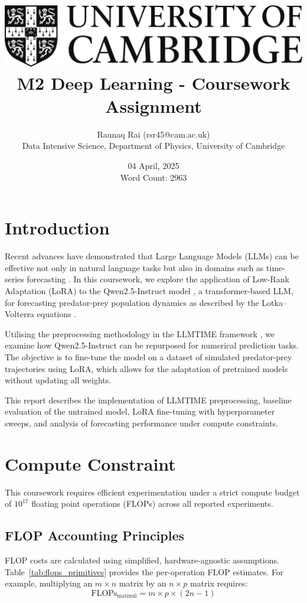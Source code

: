 \documentclass[a4paper,12pt]{article}
\title{
    \includegraphics[scale=0.4]{Cam_logo_bw.png}\\
    \vspace{0.5cm}
    M2 Deep Learning - Coursework Assignment
}
\author{Raunaq Rai (rsr45@cam.ac.uk)\\
    Data Intensive Science, Department of Physics, University of Cambridge
}
\date{04 April, 2025 \\ \vspace{0.2cm} {\small Word Count: 2963}}
\begin{document}
\maketitle

\section*{Introduction}

Recent advances have demonstrated that Large Language Models (LLMs) can be effective not only in natural language tasks but also in domains such as time-series forecasting \citep{gruver2023language}. In this coursework, we explore the application of Low-Rank Adaptation (LoRA) \citep{hu2021lora} to the Qwen2.5-Instruct model \citep{qwen2.5}, a transformer-based LLM, for forecasting predator-prey population dynamics as described by the Lotka–Volterra equations \citep{takeuchi2006lotka}.

Utilising the preprocessing methodology in the LLMTIME framework \citep{gruver2023language}, we examine how Qwen2.5-Instruct can be repurposed for numerical prediction tasks. The objective is to fine-tune the model on a dataset of simulated predator-prey trajectories using LoRA, which allows for the adaptation of pretrained models without updating all weights.

This report describes the implementation of LLMTIME preprocessing, baseline evaluation of the untrained model, LoRA fine-tuning with hyperparameter sweeps, and analysis of forecasting performance under compute constraints.

\section{Compute Constraint}

This coursework requires efficient experimentation under a strict compute budget of $10^{17}$ floating point operations (FLOPs) across all reported experiments.

\subsection*{FLOP Accounting Principles}

FLOP costs are calculated using simplified, hardware-agnostic assumptions. Table~\ref{tab:flops_primitives} provides the per-operation FLOP estimates. For example, multiplying an $m \times n$ matrix by an $n \times p$ matrix requires:
\begin{equation}
\text{FLOPs}_{\text{matmul}} = m \times p \times (2n - 1)
\end{equation}
\end{document}
